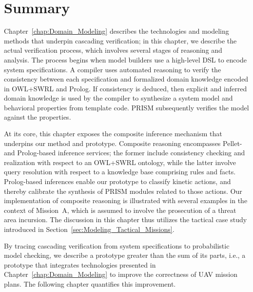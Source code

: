 \section{Summary}
\label{sec:Cascading_Verification_Summary}

Chapter~\ref{chap:Domain_Modeling} describes the technologies and modeling methods that underpin cascading verification; in this chapter, we describe the actual verification process, which involves several stages of reasoning and analysis. The process begins when model builders use a high-level DSL to encode system specifications. A compiler uses automated reasoning to verify the consistency between each specification and formalized domain knowledge encoded in OWL+SWRL and Prolog. If consistency is deduced, then explicit and inferred domain knowledge is used by the compiler to synthesize a system model and behavioral properties from template code. PRISM subsequently verifies the model against the properties.

At its core, this chapter exposes the composite inference mechanism that underpins our method and prototype. Composite reasoning encompasses Pellet- and Prolog-based inference services; the former include consistency checking and realization with respect to an OWL+SWRL ontology, while the latter involve query resolution with respect to a knowledge base comprising rules and facts. Prolog-based inferences enable our prototype to classify kinetic actions, and thereby calibrate the synthesis of PRISM modules related to those actions. Our implementation of composite reasoning is illustrated with several examples in the context of Mission~A, which is assumed to involve the prosecution of a threat area incursion. The discussion in this chapter thus utilizes the tactical case study introduced in Section~\ref{sec:Modeling_Tactical_Missions}.

By tracing cascading verification from system specifications to probabilistic model checking, we describe a prototype greater than the sum of its parts, i.e., a prototype that integrates technologies presented in Chapter~\ref{chap:Domain_Modeling} to improve the correctness of UAV mission plans. The following chapter quantifies this improvement.
